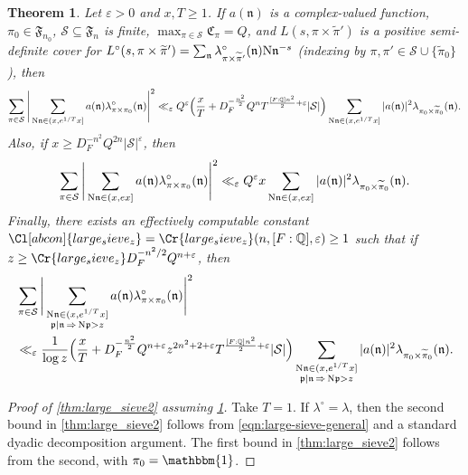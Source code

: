 \documentclass[11pt]{amsart}
\newtheorem{theorem}{Theorem}[section]
\theoremstyle{remark}
\numberwithin{equation}{section}
\newcommand{\p}{\mathfrak{p}}
\newcommand{\n}{\mathfrak{n}}
\newcommand{\F}{\mathfrak{F}}
\newcommand{\N}{\textnormal{N}}
\newcommand{\Q}{\mathbb{Q}}
\newcommand{\mS}{\mathcal{S}}
\newcommand{\eps}{\varepsilon}
\renewcommand{\tilde}{\widetilde}
\renewcommand{\epsilon}{\varepsilon}
\begin{document}
\begin{theorem}
\label{thm:large-sieve-general}
Let $\eps > 0$ and $x, T \ge 1$.  If $a(\n)$ is a complex-valued function, $\pi_0 \in \F_{n_0}$, $\mS \subseteq \F_n$ is finite, $\max_{\pi \in \mS} \mathfrak{C}_{\pi} = Q$, and $L(s, \pi \times \tilde\pi')$ is a positive semi-definite cover for $L^\circ(s, \pi \times \tilde\pi') = \sum_\n \lambda^\circ_{\pi \times \tilde\pi'}(\n) \N \n^{-s}$ (indexing by $\pi, \pi' \in \mS \cup \{\tilde\pi_0\}$), then
{\small\begin{equation}
\label{eqn:large-sieve-general}
    \sum_{\pi \in \mS}
    \Bigg| \sum_{\N \n \in (x, e^{1/T}x]} a(\n) \lambda^\circ_{\pi \times \pi_0}(\n)   \Bigg|^2
    \ll_{\epsilon}
    Q^\eps
  \Big(\frac{x}{T} + D_F^{-\frac{n^2}{2}}Q^n T^{\frac{[F:\Q]n^2}{2}+\epsilon} |\mS|\Big) \sum_{\N \n \in (x, e^{1/T}x]} |a(\n)|^2 \lambda_{\pi_0 \times \tilde\pi_0}(\n).
\end{equation}}%
Also, if $x\geq D_F^{-n^2}Q^{2n}|\mathcal{S}|^{\epsilon}$, then
\begin{equation}
\label{eqn:large-sieve-general_2}
    \sum_{\pi \in \mS}
    \Bigg| \sum_{\N \n \in (x, ex]} a(\n) \lambda^\circ_{\pi \times \pi_0}(\n)   \Bigg|^2
    \ll_{\epsilon}
  Q^{\epsilon} x
    \sum_{\N \n \in (x, ex]} |a(\n)|^2 \lambda_{\pi_0 \times \tilde\pi_0}(\n).
\end{equation}
Finally, there exists an effectively computable constant $\Cl[abcon]{large_sieve_z}=\Cr{large_sieve_z}(n,[F:\Q],\epsilon)\geq 1$ such that if $z \geq \Cr{large_sieve_z} D_F^{-n^2/2}Q^{n+\eps}$, then 
\begin{equation} \label{eqn:large-sieve-general-sifted}
\begin{aligned}
    &\sum_{\pi \in \mS}
    \Bigg| \sum_{\substack{\N \n \in (x, e^{1/T} x] \\ \p \mid \n\, \Rightarrow\, \N \p > z}} a(\n) \lambda^\circ_{\pi \times \pi_0}(\n) \Bigg|^2
    \\
    &\ll_{\epsilon}
    \frac{1}{\log z}\Big(\frac{x}{T} + D_F^{-\frac{n^2}{2}}Q^{n+\eps} z^{2n^2+2+\eps} T^{\frac{[F:\Q]n^2}{2}+\epsilon} 
     |\mS|\Big)
    \sum_{\substack{\N \n \in (x, e^{1/T} x] \\ \p \mid \n\, \Rightarrow\, \N \p > z}} |a(\n)|^2 \lambda_{\pi_0 \times \tilde\pi_0}(\n).
\end{aligned}
\end{equation}
\end{theorem}

\begin{proof}[Proof of \cref{thm:large_sieve2} assuming \cref{thm:large-sieve-general}]
Take $T=1$.  If $\lambda^\circ = \lambda$, then the second bound in \cref{thm:large_sieve2} follows from \eqref{eqn:large-sieve-general} and a standard dyadic decomposition argument.  The first bound in \cref{thm:large_sieve2} follows from the second, with $\pi_0=\mathbbm{1}$.
\end{proof}
\end{document}
